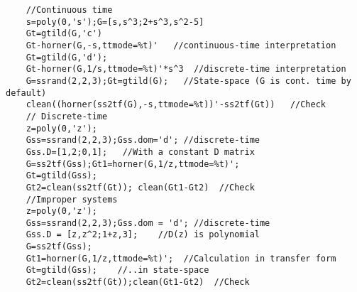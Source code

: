 \begin{examples}
  \begin{Verbatim}
    //Continuous time
    s=poly(0,'s');G=[s,s^3;2+s^3,s^2-5]
    Gt=gtild(G,'c')
    Gt-horner(G,-s,ttmode=%t)'   //continuous-time interpretation
    Gt=gtild(G,'d');
    Gt-horner(G,1/s,ttmode=%t)'*s^3  //discrete-time interpretation
    G=ssrand(2,2,3);Gt=gtild(G);   //State-space (G is cont. time by default)
    clean((horner(ss2tf(G),-s,ttmode=%t))'-ss2tf(Gt))   //Check
    // Discrete-time 
    z=poly(0,'z');
    Gss=ssrand(2,2,3);Gss.dom='d'; //discrete-time
    Gss.D=[1,2;0,1];   //With a constant D matrix
    G=ss2tf(Gss);Gt1=horner(G,1/z,ttmode=%t)';
    Gt=gtild(Gss);
    Gt2=clean(ss2tf(Gt)); clean(Gt1-Gt2)  //Check
    //Improper systems
    z=poly(0,'z');
    Gss=ssrand(2,2,3);Gss.dom = 'd'; //discrete-time
    Gss.D = [z,z^2;1+z,3];    //D(z) is polynomial 
    G=ss2tf(Gss);
    Gt1=horner(G,1/z,ttmode=%t)';  //Calculation in transfer form
    Gt=gtild(Gss);    //..in state-space 
    Gt2=clean(ss2tf(Gt));clean(Gt1-Gt2)  //Check
  \end{Verbatim}
\end{examples}
\begin{manseealso}
      
\end{manseealso}
